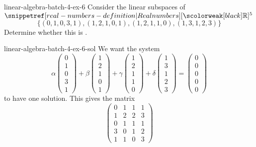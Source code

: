 \documentclass[preview]{standalone}
\begin{document}
\begin{snippetexercise}{linear-algebra-batch-4-ex-6}{}
    Consider the linear subspaces of \(\realnumbers^5\)
    \[
        \{(0,1,0,3,1),(1,2,1,0,1),(1,2,1,1,0),(1,3,1,2,3)\}
    \]
    Determine whether this \set is \linearlyindependent.
\end{snippetexercise}

\begin{snippetsolution}{linear-algebra-batch-4-ex-6-sol}{}
    We want the system
    \[
        \alpha \begin{pmatrix}
            0 \\ 1 \\ 0 \\ 3 \\ 1
        \end{pmatrix}  
        + \beta \begin{pmatrix}
            1 \\ 2 \\ 1 \\ 0 \\ 1
        \end{pmatrix}
        + \gamma \begin{pmatrix}
            1 \\ 2 \\ 1 \\ 1 \\ 0
        \end{pmatrix}
        + \delta \begin{pmatrix}
            1 \\ 3 \\ 1 \\ 2 \\ 3
        \end{pmatrix}
        = \begin{pmatrix}
            0 \\ 0 \\ 0 \\ 0 \\ 0
        \end{pmatrix}
    \]
    to have one solution. This gives the matrix
    \[
        \begin{pmatrix}
            0 & 1 & 1 & 1 \\
            1 & 2 & 2 & 3 \\
            0 & 1 & 1 & 1 \\
            3 & 0 & 1 & 2 \\
            1 & 1 & 0 & 3
        \end{pmatrix}
\]
\end{snippetsolution}
\end{document}
